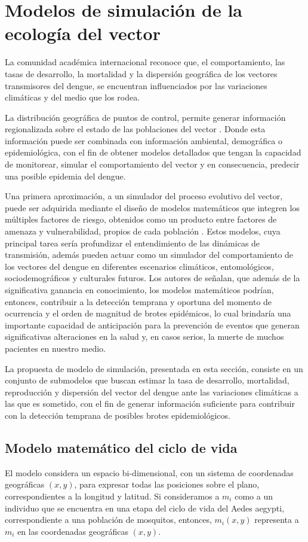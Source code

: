 \section{Modelos de simulación de la ecología del vector}
\label{sec:cap4-modelo-simulacion}

La comunidad académica internacional reconoce que, el comportamiento, las tasas de desarrollo, la
mortalidad y la dispersión geográfica de los vectores transmisores del dengue, se encuentran
influenciados por las variaciones climáticas y del medio que los rodea.

La distribución geográfica de puntos de control, permite generar información regionalizada sobre
el estado de las poblaciones del vector \cite{NINO2011}. Donde esta información puede ser
combinada con información ambiental, demográfica o epidemiológica, con el fin de obtener modelos
detallados que tengan la capacidad de monitorear, simular el comportamiento del vector y en
consecuencia, predecir una posible epidemia del dengue.

Una primera aproximación, a un simulador del proceso evolutivo del vector, puede ser adquirida
mediante el diseño de modelos matemáticos que integren los múltiples factores de riesgo, obtenidos
como un producto entre factores de amenaza y vulnerabilidad, propios de cada población
\cite{velez2013hacia}. Estos modelos, cuya principal tarea sería profundizar el entendimiento de
las dinámicas de transmisión, además pueden actuar como un simulador del comportamiento de los
vectores del dengue en diferentes escenarios climáticos, entomológicos, sociodemográficos y
culturales futuros. Los autores de \cite{velez2013hacia} señalan, que además de la significativa
ganancia en conocimiento, los modelos matemáticos podrían, entonces, contribuir a la detección
temprana y oportuna del momento de ocurrencia y el orden de magnitud de brotes epidémicos, lo cual
brindaría una importante capacidad de anticipación para la prevención de eventos que generan
significativas alteraciones en la salud y, en casos serios, la muerte de muchos pacientes en
nuestro medio.

La propuesta de modelo de simulación, presentada en esta sección, consiste en un conjunto de
submodelos que buscan estimar la tasa de desarrollo, mortalidad, reproducción y dispersión del
vector del dengue ante las variaciones climáticas a las que es sometido, con el fin de generar
información suficiente para contribuir con la detección temprana de posibles brotes
epidemiológicos.

\subsection{Modelo matemático del ciclo de vida}
\label{subsec:cap4-modelo-matematico-ciclo-vida}
El modelo considera un espacio bi-dimensional, con un sistema de coordenadas geográficas $(x,y)$,
para expresar todas las posiciones sobre el plano, correspondientes a la longitud y latitud. Si
consideramos a $m_{i}$ como a un individuo que se encuentra en una etapa del ciclo de vida del
Aedes aegypti, correspondiente a una población de mosquitos, entonces, $m_{i}(x,y)$ representa a
$m_{i}$ en las coordenadas geográficas $(x,y)$.

